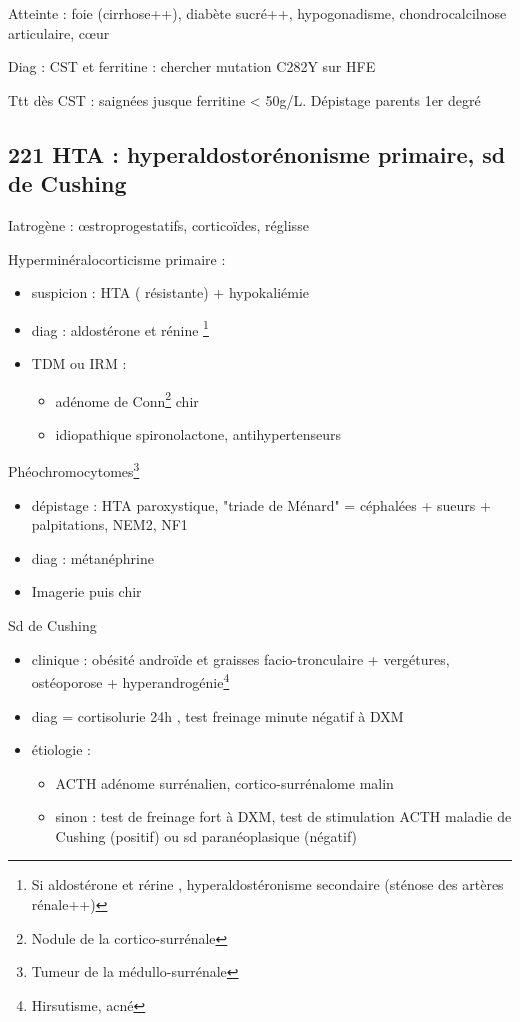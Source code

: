\documentclass[11pt]{article}
\begin{document}
Atteinte : foie (cirrhose++), diabète sucré++, hypogonadisme, chondrocalcilnose
articulaire, c\oe{}ur

Diag : CST \inc et ferritine \inc : chercher mutation C282Y sur HFE

Ttt dès CST \inc : saignées jusque ferritine < 50g/L. Dépistage parents 1er degré
\subsection{221 HTA : hyperaldostorénonisme primaire, sd de Cushing}
\label{sec:org06f889b}
\label{org4c5b3d3}
Iatrogène : \oe{}stroprogestatifs, corticoïdes, réglisse

Hyperminéralocorticisme primaire : 
\begin{itemize}
\item suspicion : HTA (\textpm{} résistante) + hypokaliémie
\item diag : aldostérone \inc et rénine \dec \footnote{Si aldostérone \inc et rérine \inc, hyperaldostéronisme secondaire
(sténose des artères rénale++)}
\item TDM ou IRM : 
\begin{itemize}
\item adénome de Conn\footnote{Nodule de la cortico-surrénale} \thus chir
\item idiopathique \thus spironolactone, antihypertenseurs
\end{itemize}
\end{itemize}

Phéochromocytomes\footnote{Tumeur de la médullo-surrénale}
\begin{itemize}
\item dépistage : HTA paroxystique, "triade de Ménard" = céphalées + sueurs +
palpitations, NEM2, NF1
\item diag : métanéphrine \inc
\item Imagerie puis chir
\end{itemize}
Sd de Cushing
\begin{itemize}
\item clinique : obésité androïde et graisses facio-tronculaire + vergétures,
ostéoporose + hyperandrogénie\footnote{Hirsutisme, acné}
\item diag = cortisolurie 24h \inc, test freinage minute négatif à DXM
\item étiologie :
\begin{itemize}
\item ACTH \dec \thus adénome surrénalien, cortico-surrénalome malin
\item sinon : test de freinage fort à DXM, test de stimulation ACTH \thus maladie
de Cushing (positif) ou sd paranéoplasique (négatif)
\end{itemize}
\end{itemize}
\end{document}

